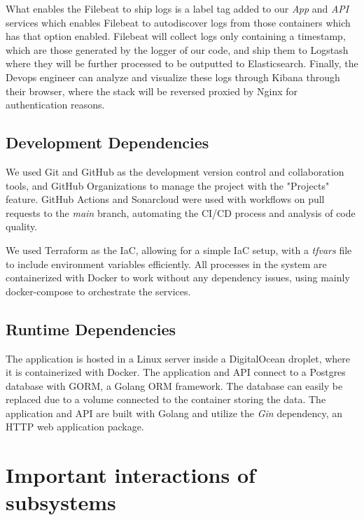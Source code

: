 \documentclass[12pt, a4paper, oneside]{book}
\begin{document}
What enables the Filebeat to ship logs is a label tag added to our \textit{App} and \textit{API} services which enables Filebeat to autodiscover logs from those containers which has that option enabled. Filebeat will collect logs only containing a timestamp, which are those generated by the logger of our code, and ship them to Logstash where they will be further processed to be outputted to Elasticsearch. Finally, the Devops engineer can analyze and visualize these logs through Kibana through their browser, where the stack will be reversed proxied by Nginx for authentication reasons. \bigskip

\subsection{Development Dependencies}
We used Git and GitHub as the development version control and collaboration tools, and GitHub Organizations to manage the project with the "Projects" feature. 
GitHub Actions and Sonarcloud were used with workflows on pull requests to the \textit{main} branch, automating the CI/CD process and analysis of code quality.\bigskip

We used Terraform as the IaC, allowing for a simple IaC setup, with a \textit{tfvars} file to include environment variables efficiently.
All processes in the system are containerized with Docker to work without any dependency issues, using mainly docker-compose to orchestrate the services.\bigskip


\subsection{Runtime Dependencies}
The application is hosted in a Linux server inside a DigitalOcean droplet, where it is containerized with Docker.
The application and API connect to a Postgres database with GORM, a Golang ORM framework.
The database can easily be replaced due to a volume connected to the container storing the data.
The application and API are built with Golang and utilize the \textit{Gin} dependency, an HTTP web application package.




\section{Important interactions of subsystems}
\end{document}
